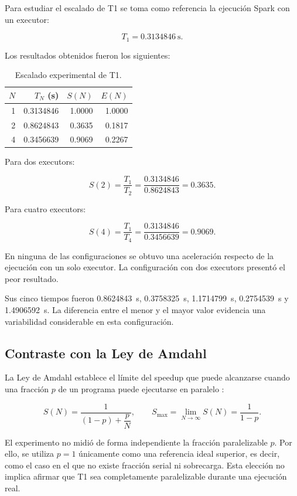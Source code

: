 \documentclass[12pt,a4paper]{article}
\begin{document}
Para estudiar el escalado de T1 se toma como referencia la ejecución Spark con
un executor:

\[
T_1=\SI{0.3134846}{\second}.
\]

Los resultados obtenidos fueron los siguientes:

\begin{table}[H]
\centering
\caption{Escalado experimental de T1.}
\label{tab:escalado}
\begin{tabular}{rrrr}
\toprule
\textbf{$N$} &
\textbf{$T_N$ (s)} &
\textbf{$S(N)$} &
\textbf{$E(N)$} \\
\midrule
1 & 0.3134846 & 1.0000 & 1.0000 \\
2 & 0.8624843 & 0.3635 & 0.1817 \\
4 & 0.3456639 & 0.9069 & 0.2267 \\
\bottomrule
\end{tabular}
\end{table}

Para dos executors:

\[
S(2)=
\frac{T_1}{T_2}=
\frac{0.3134846}{0.8624843}=
0.3635.
\]

Para cuatro executors:

\[
S(4)=
\frac{T_1}{T_4}=
\frac{0.3134846}{0.3456639}=
0.9069.
\]

En ninguna de las configuraciones se obtuvo una aceleración respecto de la
ejecución con un solo executor. La configuración con dos executors presentó el
peor resultado.

Sus cinco tiempos fueron \SI{0.8624843}{\second},
\SI{0.3758325}{\second}, \SI{1.1714799}{\second},
\SI{0.2754539}{\second} y \SI{1.4906592}{\second}. La diferencia entre el
menor y el mayor valor evidencia una variabilidad considerable en esta
configuración.

\subsection{Contraste con la Ley de Amdahl}

La Ley de Amdahl establece el límite del speedup que puede alcanzarse cuando
una fracción $p$ de un programa puede ejecutarse en paralelo
\cite{amdahl1967}:

\begin{equation}
S(N)=
\frac{1}
{(1-p)+\dfrac{p}{N}},
\qquad
S_{\max}=
\lim_{N\rightarrow\infty}S(N)=
\frac{1}{1-p}.
\label{eq:amdahl}
\end{equation}

El experimento no midió de forma independiente la fracción paralelizable $p$.
Por ello, se utiliza $p=1$ únicamente como una referencia ideal superior, es
decir, como el caso en el que no existe fracción serial ni sobrecarga. Esta
elección no implica afirmar que T1 sea completamente paralelizable durante una
ejecución real.
\end{document}
